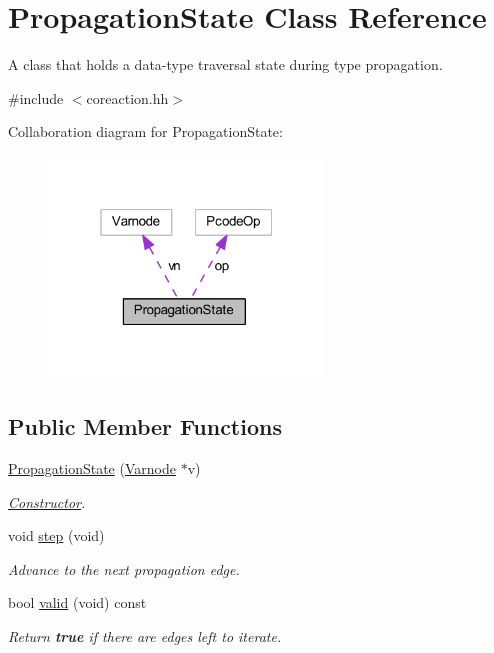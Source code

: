 \hypertarget{class_propagation_state}{}\section{Propagation\+State Class Reference}
\label{class_propagation_state}


A class that holds a data-\/type traversal state during type propagation.  




{\ttfamily \#include $<$coreaction.\+hh$>$}



Collaboration diagram for Propagation\+State\+:
\nopagebreak
\begin{figure}[H]
\begin{center}
\leavevmode
\includegraphics[width=208pt]{class_propagation_state__coll__graph}
\end{center}
\end{figure}
\subsection*{Public Member Functions}
\begin{DoxyCompactItemize}
\item 
\mbox{\hyperlink{class_propagation_state_a0d46f7392b5cc38c418e92429cde1a83}{Propagation\+State}} (\mbox{\hyperlink{class_varnode}{Varnode}} $\ast$v)
\begin{DoxyCompactList}\small\item\em \mbox{\hyperlink{class_constructor}{Constructor}}. \end{DoxyCompactList}\item 
void \mbox{\hyperlink{class_propagation_state_a49ccacb0e834ad22fc157dc701f14b46}{step}} (void)
\begin{DoxyCompactList}\small\item\em Advance to the next propagation edge. \end{DoxyCompactList}\item 
bool \mbox{\hyperlink{class_propagation_state_af00ae2cafa9fe3527412168c94de6280}{valid}} (void) const
\begin{DoxyCompactList}\small\item\em Return {\bfseries{true}} if there are edges left to iterate. \end{DoxyCompactList}\end{DoxyCompactItemize}
